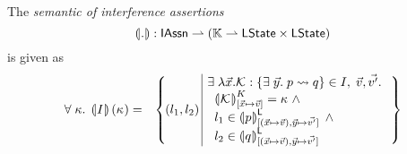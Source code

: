 %
%
\begin{definition}
The \emph{semantic of interference assertions}
%
\[
	\left( \hspace*{-2pt}\left| . \right| \hspace*{-2pt} \right) : \textsf{IAssn} \rightharpoonup \left(\mathbb{K} \rightharpoonup  \textsf{LState} \times \textsf{LState} \right)
\]
%
is given as
%
\[
\begin{array}{r l}
	\for{\kappa} \intermediateSemI{I}(\ca{}) =
	 	&
	 	\left\{
		\begin{array}{l | r}
			
			\hspace*{-0.2cm}(l_1, l_2)\hspace*{-0.1cm} & 
			\hspace*{-0.2cm}
			\begin{array}{l}
				\exsts{\interAss{\vec{x}}{\capAss{}}{\vec{y}}{p}{q} \in I,\; \vec{v}, \vec{v'}}\\
	
				\hspace*{0.2cm}
				\semK[\text{[} \vec{x} \mapsto \vec{v} \text{]}]{\capAss{}} = \ca{} \; \land\\
				
				\hspace*{0.2cm}
				l_1 \in \semL[\text{[} \left(\vec{x} \mapsto \vec{v}\right), \vec{y} \mapsto \vec{v'} \text{]}]{p} \;\land\\
				

				
				\hspace*{0.2cm}
				l_2 \in \semL[\text{[} \left(\vec{x} \mapsto \vec{v}\right), \vec{y} \mapsto \vec{v'} \text{]}]{q} 
				
			\end{array}
		\end{array}
	\hspace*{-0.2cm}
	\right\}\\\\
	
%	
%	
%			
	
\end{array}
\]
%
\end{definition}

